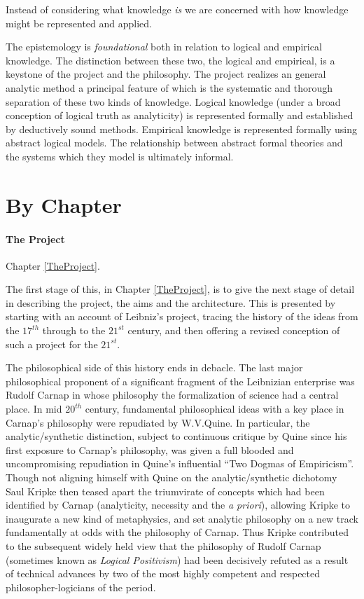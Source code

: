 Instead of considering what knowledge \emph{is} we are concerned with
how knowledge might be represented and applied.

The epistemology is \emph{foundational} both in relation to logical
and empirical knowledge.
The distinction between these two, the logical and empirical, is a
keystone of the project and the philosophy.
The project realizes an general analytic method a principal feature of
which is the systematic and thorough separation of these two kinds of
knowledge.
Logical knowledge (under a broad conception of logical truth as
analyticity) is represented formally and established by deductively
sound methods.
Empirical knowledge is represented formally using abstract logical
models.
The relationship between abstract formal theories and the systems
which they model is ultimately informal.


\section{By Chapter}

\paragraph{The Project}

Chapter \ref{TheProject}.

The first stage of this, in Chapter \ref{TheProject}, is to give the
next stage of detail in describing the project, the aims and the
architecture.
This is presented by starting with an account of Leibniz's project,
tracing the history of the ideas from the $17^{th}$ through to the
$21^{st}$ century, and then offering a revised conception of such a
project for the $21^{st}$.

The philosophical side of this history ends in debacle.
The last major philosophical proponent of a significant fragment of
the Leibnizian enterprise was Rudolf Carnap in whose philosophy the
formalization of science had a central place.
In mid $20^{th}$ century, fundamental philosophical ideas with a key
place in Carnap's philosophy were repudiated by W.V.Quine.
In particular, the analytic/synthetic distinction, subject to
continuous critique by Quine since his first exposure to Carnap's
philosophy, was given a full blooded and uncompromising repudiation in
Quine's influential ``Two Dogmas of Empiricism''.
Though not aligning himself with Quine on the analytic/synthetic
dichotomy Saul Kripke then teased apart the triumvirate of concepts
which had been identified by Carnap (analyticity, necessity and the
\emph{a priori}), allowing Kripke to inaugurate a new kind of
metaphysics, and set analytic philosophy on a new track fundamentally
at odds with the philosophy of Carnap.
Thus Kripke contributed to the subsequent widely held view that the
philosophy of Rudolf Carnap (sometimes known as \emph{Logical
  Positivism}) had been decisively refuted as a result of technical
advances by two of the most highly competent and respected
philosopher-logicians of the period.

